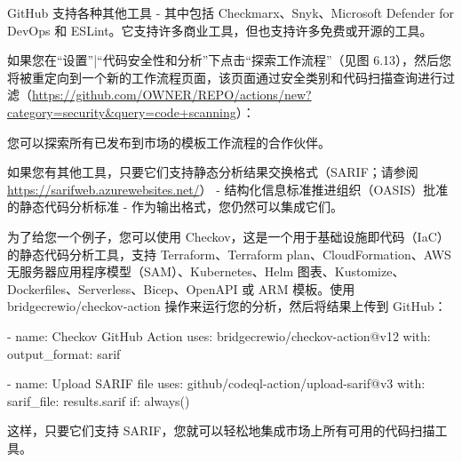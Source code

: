 
GitHub 支持各种其他工具 - 其中包括 Checkmarx、Snyk、Microsoft Defender for DevOps 和 ESLint。它支持许多商业工具，但也支持许多免费或开源的工具。

如果您在“设置”|“代码安全性和分析”下点击“探索工作流程”（见图 6.13），然后您将被重定向到一个新的工作流程页面，该页面通过安全类别和代码扫描查询进行过滤（\url{https://github.com/OWNER/REPO/actions/new?category=security&query=code+scanning}）：


您可以探索所有已发布到市场的模板工作流程的合作伙伴。

如果您有其他工具，只要它们支持静态分析结果交换格式（SARIF；请参阅 \url{https://sarifweb.azurewebsites.net/}） - 结构化信息标准推进组织（OASIS）批准的静态代码分析标准 - 作为输出格式，您仍然可以集成它们。

为了给您一个例子，您可以使用 Checkov，这是一个用于基础设施即代码（IaC）的静态代码分析工具，支持 Terraform、Terraform plan、CloudFormation、AWS 无服务器应用程序模型（SAM）、Kubernetes、Helm 图表、Kustomize、Dockerfiles、Serverless、Bicep、OpenAPI 或 ARM 模板。使用 bridgecrewio/checkov-action 操作来运行您的分析，然后将结果上传到 GitHub：

\begin{shell}
- name: Checkov GitHub Action
  uses: bridgecrewio/checkov-action@v12
  with:
    output_format: sarif

- name: Upload SARIF file
  uses: github/codeql-action/upload-sarif@v3
  with:
    sarif_file: results.sarif
  if: always()
\end{shell}

这样，只要它们支持 SARIF，您就可以轻松地集成市场上所有可用的代码扫描工具。












